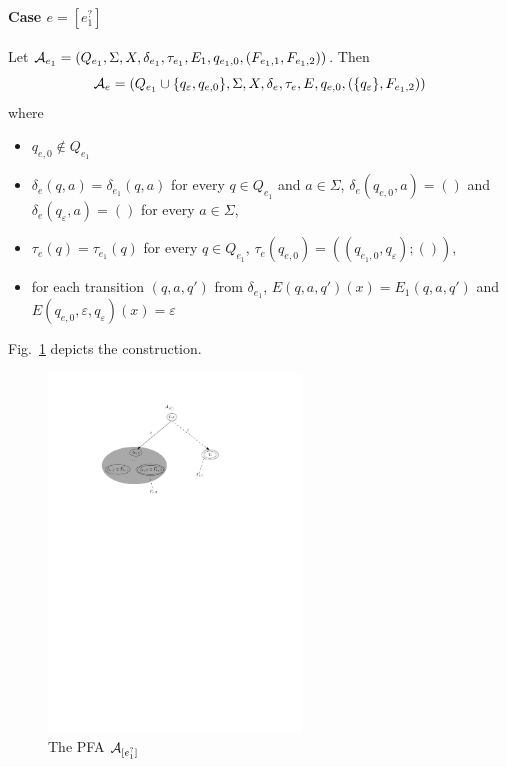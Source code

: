 \paragraph{Case $e = [e_1^?]$} Let $\mathcal{A}_{e_1} = (Q_{e_1}, \Sigma, X, \delta_{e_1}, \tau_{e_1}, E_1, q_{e_1,0}, (F_{e_1,1}, F_{e_1,2}))$. Then 
\[\mathcal{A}_e = (Q_{e_1} \cup \{q_{\varepsilon}, q_{e,0}\}, \Sigma, X, 
		\delta_e, \tau_e, E, q_{e,0}, (\{q_{\varepsilon}\}, F_{e_1,2}))\]
where  
		\begin{itemize}
			\item $q_{e,0}  \not \in Q_{e_1}$
			\item $\delta_e(q, a) = \delta_{e_1}(q, a)$ for every $q \in Q_{e_1}$ and $a \in \Sigma$, $\delta_e(q_{e,0}, a)  = ()$ and $\delta_e(q_{\varepsilon}, a) = ()$ for every $a \in \Sigma$, 
			\item $\tau_e(q) = \tau_{e_1}(q)$ for every $q \in Q_{e_1}$, $\tau_e(q_{e,0}) = ((q_{e_1,0},q_{\varepsilon}); ())$,
			\item for each transition $(q, a, q')$ from $\delta_{e_1}$, $E(q,a,q')(x) =E_1(q, a,q')$ and $E(q_{e,0},\varepsilon,q_{\varepsilon})(x) =\varepsilon$
		\end{itemize}
%
Fig.~\ref{fig-reg2pfa-6} depicts the construction.
		\begin{figure}[ht]
			\centering
			\includegraphics[width = 0.6\textwidth]{reg2pfa-6.pdf}
			\caption{The PFA $\mathcal{A}_{[e_1^?]}$}
			\label{fig-reg2pfa-6}
		\end{figure}


